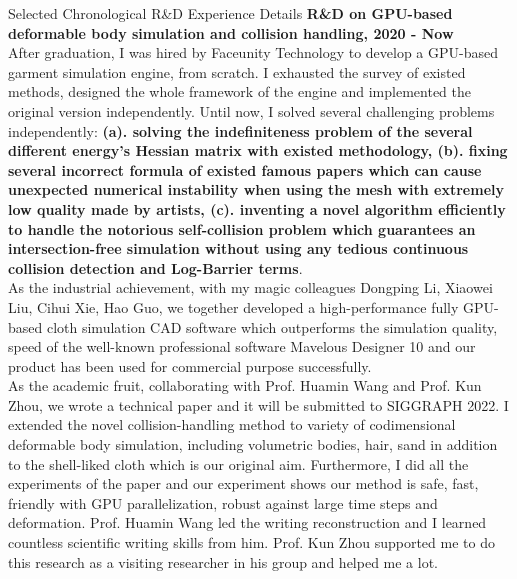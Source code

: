 \documentclass{resume} %
\begin{document}
\begin{rSection}{Selected Chronological R\&D Experience Details}
  {\bf R\&D on GPU-based deformable body simulation and collision handling, 2020 - Now}\\ After graduation, I was hired by Faceunity Technology to develop a GPU-based garment simulation engine, from scratch. I exhausted the survey of existed methods, designed the whole framework of the engine and implemented the original version independently. Until now, I solved several challenging problems independently:\textbf{ (a). solving the indefiniteness problem of the several different energy's Hessian matrix with existed methodology, (b). fixing several incorrect formula of existed famous papers which can cause unexpected numerical instability when using the mesh with extremely low quality made by artists, (c). inventing a novel algorithm efficiently to handle the notorious self-collision problem which guarantees an intersection-free simulation without using any tedious continuous collision detection and Log-Barrier terms}.\\
  \hspace*{2em} As the industrial achievement, with my magic colleagues Dongping Li, Xiaowei Liu, Cihui Xie, Hao Guo, we together developed a high-performance fully GPU-based cloth simulation CAD software which outperforms the simulation quality, speed of the well-known professional software Mavelous Designer 10 and our product has been used for commercial purpose successfully. \\
  \hspace*{2em} As the academic fruit, collaborating with Prof. Huamin Wang and Prof. Kun Zhou, we wrote a technical paper and it will be submitted to SIGGRAPH 2022. I extended the novel collision-handling method to variety of codimensional deformable body simulation, including volumetric bodies, hair, sand in addition to the shell-liked cloth which is our original aim. Furthermore, I did all the experiments of the paper and our experiment shows our method is safe, fast, friendly with GPU parallelization, robust against large time steps and deformation. Prof. Huamin Wang led the writing reconstruction and I learned countless scientific writing skills from him. Prof. Kun Zhou supported me to do this research as a visiting researcher in his group and helped me a lot.\\

\end{rSection}
\end{document}
